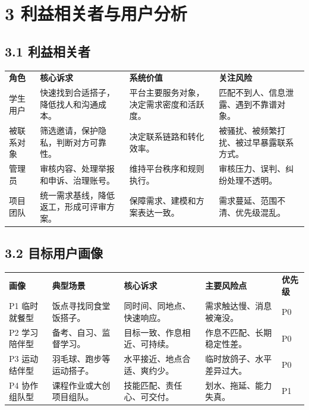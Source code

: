 \chapter{3
利益相关者与用户分析}\label{ux5229ux76caux76f8ux5173ux8005ux4e0eux7528ux6237ux5206ux6790}

\section{3.1 利益相关者}\label{ux5229ux76caux76f8ux5173ux8005}

{\def\LTcaptype{none} %
\begin{xltabular}{\textwidth}{@{}>{\centering\arraybackslash}X>{\centering\arraybackslash}X>{\centering\arraybackslash}X>{\centering\arraybackslash}X@{}}
\toprule\noalign{}
\endhead
\bottomrule\noalign{}
\endlastfoot
\textbf{角色} & \textbf{核心诉求} & \textbf{系统价值} &
\textbf{关注风险} \\
学生用户 & 快速找到合适搭子，降低找人和沟通成本。 &
平台主要服务对象，决定需求密度和活跃度。 &
匹配不到人、信息泄露、遇到不靠谱对象。 \\
被联系对象 & 筛选邀请，保护隐私，判断对方可靠性。 &
决定联系链路和转化效率。 & 被骚扰、被频繁打扰、被过早暴露联系方式。 \\
管理员 & 审核内容、处理举报和申诉、治理账号。 & 维持平台秩序和规则执行。
& 审核压力、误判、纠纷处理不透明。 \\
项目团队 & 统一需求基线，降低返工，形成可评审方案。 &
保障需求、建模和方案表达一致。 & 需求蔓延、范围不清、优先级混乱。 \\
\end{xltabular}
}

\section{3.2
目标用户画像}\label{ux76eeux6807ux7528ux6237ux753bux50cf}

{\def\LTcaptype{none} %
\begin{xltabular}{\textwidth}{@{}>{\centering\arraybackslash}X>{\centering\arraybackslash}X>{\centering\arraybackslash}X>{\centering\arraybackslash}X>{\centering\arraybackslash}X@{}}
\toprule\noalign{}
\endhead
\bottomrule\noalign{}
\endlastfoot
\textbf{画像} & \textbf{典型场景} & \textbf{核心诉求} &
\textbf{主要风险点} & \textbf{优先级} \\
P1 临时就餐型 & 饭点寻找同食堂饭搭子。 & 同时间、同地点、快速响应。 &
需求触达慢、消息被淹没。 & P0 \\
P2 学习陪伴型 & 备考、自习、监督学习。 & 目标一致、作息相近、可持续。 &
作息不匹配、长期稳定性差。 & P0 \\
P3 运动结伴型 & 羽毛球、跑步等运动搭子。 & 水平接近、地点合适、爽约少。
& 临时放鸽子、水平差异过大。 & P0 \\
P4 协作组队型 & 课程作业或大创项目组队。 & 技能匹配、责任心、可交付。 &
划水、拖延、能力失真。 & P1 \\
\end{xltabular}
}


